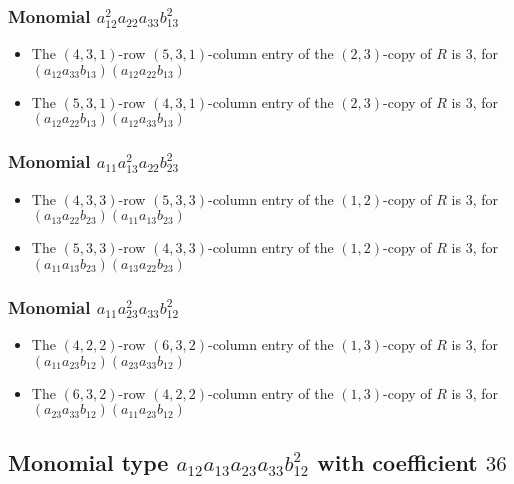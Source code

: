 \documentclass{article}
\begin{document}
\subsubsection{Monomial $ a_{12}^{2} a_{22} a_{33} b_{13}^{2} $}

\begin{itemize}
\item The $(4, 3, 1)$-row $(5, 3, 1)$-column entry of the $ \left(2, 3\right) $-copy of $R$ is $ 3 $, for $( a_{12} a_{33} b_{13} )( a_{12} a_{22} b_{13} )$ 
\item The $(5, 3, 1)$-row $(4, 3, 1)$-column entry of the $ \left(2, 3\right) $-copy of $R$ is $ 3 $, for $( a_{12} a_{22} b_{13} )( a_{12} a_{33} b_{13} )$ 
\end{itemize}
\subsubsection{Monomial $ a_{11} a_{13}^{2} a_{22} b_{23}^{2} $}

\begin{itemize}
\item The $(4, 3, 3)$-row $(5, 3, 3)$-column entry of the $ \left(1, 2\right) $-copy of $R$ is $ 3 $, for $( a_{13} a_{22} b_{23} )( a_{11} a_{13} b_{23} )$ 
\item The $(5, 3, 3)$-row $(4, 3, 3)$-column entry of the $ \left(1, 2\right) $-copy of $R$ is $ 3 $, for $( a_{11} a_{13} b_{23} )( a_{13} a_{22} b_{23} )$ 
\end{itemize}
\subsubsection{Monomial $ a_{11} a_{23}^{2} a_{33} b_{12}^{2} $}

\begin{itemize}
\item The $(4, 2, 2)$-row $(6, 3, 2)$-column entry of the $ \left(1, 3\right) $-copy of $R$ is $ 3 $, for $( a_{11} a_{23} b_{12} )( a_{23} a_{33} b_{12} )$ 
\item The $(6, 3, 2)$-row $(4, 2, 2)$-column entry of the $ \left(1, 3\right) $-copy of $R$ is $ 3 $, for $( a_{23} a_{33} b_{12} )( a_{11} a_{23} b_{12} )$ 
\end{itemize}
\subsection{Monomial type $ a_{12} a_{13} a_{23} a_{33} b_{12}^{2} $ with coefficient $ 36 $}
\end{document}
